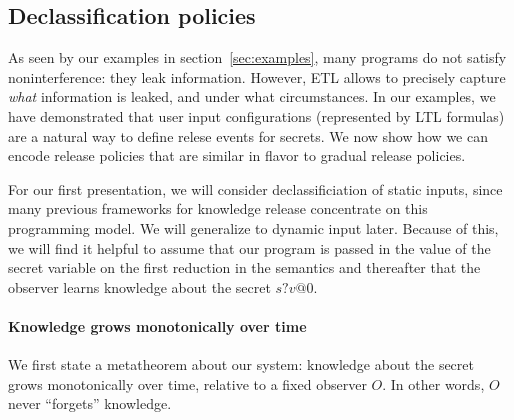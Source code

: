 \documentclass[conference]{IEEEtran}
\theoremstyle{definition}
\newtheorem{defn}{Definition}[section]
\newtheorem{thm}{Theorem}[section]
\newcommand{\prin}{\textit{O}}
\newcommand{\comment}[3][\color{red}]{{#1{[{#2}: {#3}]}}}
\newcommand{\kris}[1]{\comment[\color{orange}]{kris}{#1}}
\begin{document}



\subsection{Declassification policies}

As seen by our examples in section~\ref{sec:examples}, many programs
do not satisfy noninterference: they leak information.  However, ETL
allows to precisely capture \emph{what} information is leaked, and
under what circumstances.  In our examples, we have demonstrated that
user input configurations (represented by LTL formulas) are a natural
way to define relese events for secrets.  We now show how we can
encode release policies that are similar in flavor to gradual release
policies.

For our first presentation, we will consider declassificiation of
static inputs, since many previous frameworks \kris{cite} for
knowledge release concentrate on this programming model.  We will
generalize to dynamic input later.  Because of this, we will find it
helpful to assume that our program is passed in the value of the
secret variable on the first reduction in the semantics and thereafter
that the observer learns knowledge about the secret $s?v@0$.

\paragraph*{Knowledge grows monotonically over time}

We first state a metatheorem about our system: knowledge about the
secret grows monotonically over time, relative to a fixed observer
$\prin$. In other words, $\prin$ never ``forgets'' knowledge.
\end{document}
